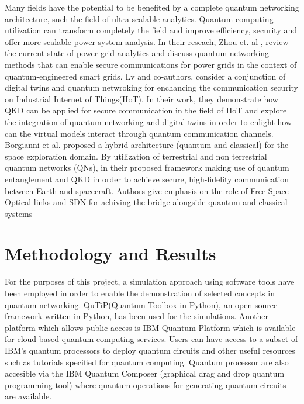 \documentclass[12pt]{ieeetj}
\begin{document}
		Many fields have the potential to be benefited by a complete quantum networking architecture, 
		such the field of ultra scalable analytics. Quantum computing utilization can transform completely
		the field and improve efficiency, security and offer more scalable power system analysis.
		In their reseach, Zhou et. al \cite{powergrid}, review the current state of power grid analytics 
		and discuss quantum networking methods that can enable secure communications for power grids 
		in the context of quantum-engineered smart grids.
		Lv and co-authors\cite{digital-twins}, consider a conjunction of digital twins and quantum netwroking for enchancing the
		communication security on Industrial Internet of Things(IIoT). In their work, they demonstrate how QKD can be applied
		for secure communication in the field of IIoT and explore the integration of quantum networking and digital twins in order
		to enlight how can the virtual models interact through quantum communication channels.
		Borgianni et al.\cite{space} proposed a hybrid architecture (quantum and classical) for the space exploration domain. 
		By utilization of terrestrial and non terrestrial quantum networks (QNs), 
		in their proposed framework making use of quantum entanglement and QKD in order to achieve secure,
		high-fidelity communication between Earth and spacecraft. 
		Authors give emphasis on the role of Free Space Optical links and SDN for achiving the 
		bridge alongside quantum and classical systems

	\section{Methodology and Results}
		
		For the purposes of this project, a
		simulation approach using software tools
		have been employed in order to enable the
		demonstration of selected concepts in quantum networking.
		QuTiP(Quantum Toolbox in Python)\cite{qutip}, an open source framework
		written in Python, has been used for the simulations.
		Another platform which allows public access is IBM Quantum Platform\cite{qiskit} which is available for cloud-based quantum computing services. 
		Users can have access to a subset of IBM's quantum processors to deploy quantum circuits 
		and other useful resources such as tutorials specified for quantum computing. Quantum processor are also accesible via the
		IBM Quantum Composer (graphical drag and drop quantum programming tool) where quantum operations for generating quantum circuits 
		are available.
\end{document}
